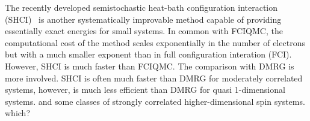 \documentclass[%
reprint,
 superscriptaddress,
 amsmath,amssymb,
 aps,
]{revtex4-1}
\begin{document}

The recently developed semistochastic heat-bath configuration interaction (SHCI)~\cite{HolTubUmr-JCTC-16,ShaHolJeaAlaUmr-JCTC-17,HolUmrSha-JCP-17,SmiMusHolSha-JCTC-17,MusSha-JCTC-17,ChiHolOttUmrShaZim-JPCA-18} is another systematically improvable method capable of providing essentially exact energies for small systems.
In common with FCIQMC, the computational cost of the method scales exponentially in the number of electrons but with a
much smaller exponent than in full configuration interation (FCI).  However, SHCI is much faster than FCIQMC.
The comparison with DMRG is more involved.  SHCI is often much faster than DMRG for moderately correlated systems,
however, is much less efficient than DMRG for quasi 1-dimensional systems.{\color{red} and some classes of strongly correlated 
higher-dimensional spin systems. which?}
\end{document}
